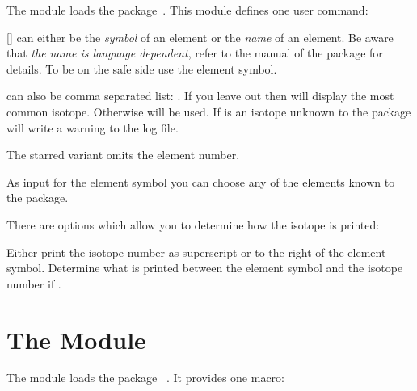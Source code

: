 \documentclass{chemmacros-manual}
\begin{document}
The  module loads the 
package~\cite{pkg:elements}.  This module defines one user command:
\begin{commands}
  [\sarg{}]
     can either be the \emph{symbol} of an element or the
    \emph{name} of an element.  Be aware that \emph{the name is language
      dependent}, refer to the manual of the  package for
    details.  To be on the safe side use the element symbol.

     can also be comma separated list:
    .  If you leave  out
    then  will display the most common isotope.  Otherwise
     will be used.  If  is an isotope unknown to the
     package  will write a warning to the log file.

    The starred variant omits the element number.
\end{commands}

\begin{example}
\end{example}

As input for the element symbol you can choose any of the elements known to
the  package.

There are options which allow you to determine how the isotope is printed:
\begin{options}
    Either print the isotope number as superscript or to the right of the
    element symbol.
  \Default{-}
    Determine what is printed between the element symbol and the isotope
    number if .
\end{options}

\begin{example}
\end{example}

\section{The  Module}\label{sec:mechanisms-module}

The module  loads the package
~\cite{pkg:amstext}.  It provides one macro:
\end{document}
